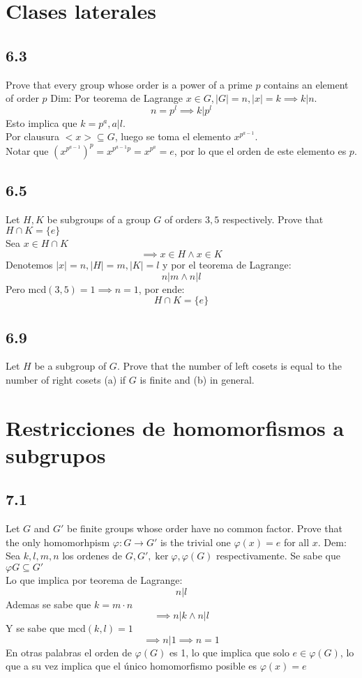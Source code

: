 \documentclass[11pt]{article}
\begin{document}
\section{Clases laterales}
\subsection*{6.3}
Prove that every group whose order is a power of a prime $p$ contains an element of order $p$
Dim: Por teorema de Lagrange $x\in G,|G|=n,|x|=k\implies k|n$.
\[
n=p^l\implies k|p^l
\]
Esto implica que $k=p^a,a|l$.\\
Por clausura $<x>\subseteq G$, luego se toma el elemento $x^{p^{a-1}}$.\\
Notar que $(x^{p^{a-1}})^p=x^{p^{a-1}p}=x^{p^a}=e$, por lo que el orden de este elemento es $p$.
\subsection*{6.5}
Let $H,K$ be subgroups of a group $G$ of orders $3,5$ respectively. Prove that $H\cap K=\{e\}$\\
Sea $x\in H\cap K$
\[\implies x\in H \wedge x\in K\]
Denotemos $|x|=n,|H|=m,|K|=l$ y por el teorema de Lagrange:
\[ n|m\wedge n|l\]
Pero mcd$(3,5)=1\implies n=1$, por ende:
\[ H\cap K=\{e\}\]
\subsection*{6.9}
Let $H$ be a subgroup of $G$. Prove that the number of left cosets is equal to the number of right cosets (a) if $G$ is finite and (b) in general.

\section{Restricciones de homomorfismos a subgrupos}
\subsection*{7.1}
Let $G$ and $G'$ be finite groups whose order have no common factor. Prove that the only homomorhpism $\varphi:G\rightarrow G'$ is the trivial one $\varphi(x)=e$ for all $x$.
Dem: Sea $k,l,m,n$ los ordenes de $G,G',\ker\varphi,\varphi(G)$ respectivamente.
Se sabe que $\varphi{G}\subseteq G'$\\
Lo que implica por teorema de Lagrange:
\[
n|l
\]
Ademas se sabe que $k=m\cdot n$
\[
\implies n|k\wedge n|l
\]
Y se sabe que mcd$(k,l)=1$
\[
\implies n|1\implies n=1
\]
En otras palabras el orden de $\varphi(G)$ es 1, lo que implica que solo $e\in\varphi(G)$, lo que a su vez implica que el único homomorfismo posible es $\varphi(x)=e$
\end{document}
